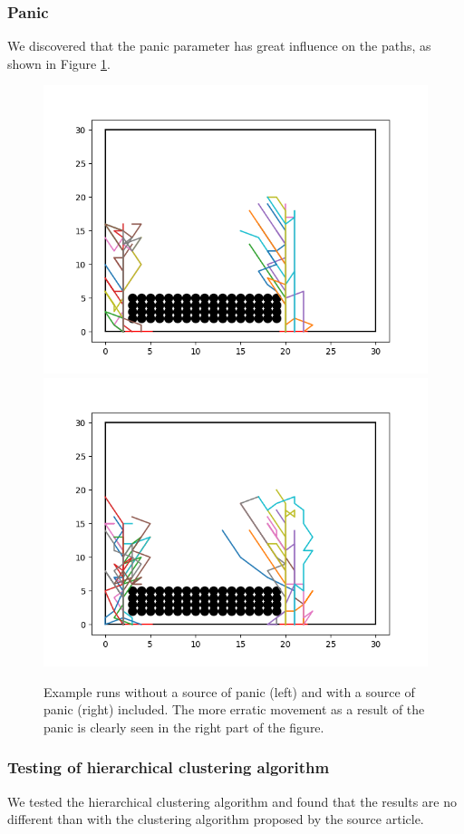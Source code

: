 \documentclass[9pt]{pnas-new}
\begin{document}
\subsubsection{Panic}
We discovered that the panic parameter has great influence on the paths, as shown in Figure \ref{fig:panic}.

\begin{figure}[h!]
    \centering
    \includegraphics[width=0.45\linewidth]{fig/path_plot_nopanic.png}
    \hfill
    \includegraphics[width=0.45\linewidth]{fig/path_plot_panic.png}
    \caption{Example runs without a source of panic (left) and with a source of panic (right) included. The more erratic movement as a result of the panic is clearly seen in the right part of the figure.}
    \label{fig:panic}
\end{figure}

\subsubsection{Testing of hierarchical clustering algorithm}

We tested the hierarchical clustering algorithm and found that the results are no different than with the clustering algorithm proposed by the source article.
\end{document}
